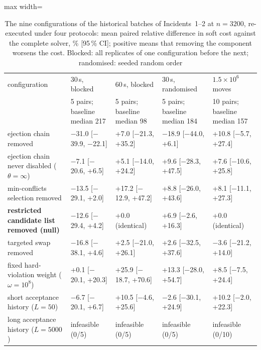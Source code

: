 \begin{table}[t]
\centering
\caption{The nine configurations of the historical batches of Incidents~1--2 at $n=3200$, re-executed under four
protocols: mean paired relative difference in soft cost against the complete solver, \% [95\,\% CI]; positive
means that removing the component worsens the cost. Blocked: all replicates of one configuration
before the next; randomised: seeded random order}
\label{tab:protocol}
\footnotesize
\begin{adjustbox}{max width=\textwidth}
\begin{tabular}{@{}l l l l l@{}}
\toprule
configuration & 30\,s, blocked & 60\,s, blocked & 30\,s, randomised & $1.5\times10^6$ moves \\
 & 5 pairs; baseline median 217 & 5 pairs; baseline median 98 & 5 pairs; baseline median 184 & 10 pairs; baseline median 157 \\
\midrule
ejection chain removed & $-$31.0 [$-$39.9, $-$22.1] & +7.0 [$-$21.3, +35.2] & $-$18.9 [$-$44.0, +6.1] & +10.8 [$-$5.7, +27.4] \\
ejection chain never disabled ($\theta=\infty$) & $-$7.1 [$-$20.6, +6.5] & +5.1 [$-$14.0, +24.2] & +9.6 [$-$28.3, +47.5] & +7.6 [$-$10.6, +25.8] \\
min-conflicts selection removed & $-$13.5 [$-$29.1, +2.0] & +17.2 [$-$12.9, +47.2] & +8.8 [$-$26.0, +43.6] & +8.1 [$-$11.1, +27.3] \\
\textbf{restricted candidate list removed (null)} & $-$12.6 [$-$29.4, +4.2] & +0.0 (identical) & +6.9 [$-$2.6, +16.3] & +0.0 (identical) \\
targeted swap removed & $-$16.8 [$-$38.1, +4.6] & +2.5 [$-$21.0, +26.1] & +2.6 [$-$32.5, +37.6] & $-$3.6 [$-$21.2, +14.0] \\
fixed hard-violation weight ($\omega=10^8$) & +0.1 [$-$20.1, +20.3] & +25.9 [$-$18.7, +70.6] & +13.3 [$-$28.0, +54.7] & +8.5 [$-$7.5, +24.4] \\
short acceptance history ($L=50$) & $-$6.7 [$-$20.1, +6.7] & +10.5 [$-$4.6, +25.6] & $-$2.6 [$-$30.1, +24.9] & +10.2 [$-$2.0, +22.3] \\
long acceptance history ($L=5000$) & infeasible (0/5) & infeasible (0/5) & infeasible (0/5) & infeasible (0/10) \\
\bottomrule
\end{tabular}
\end{adjustbox}
\end{table}
